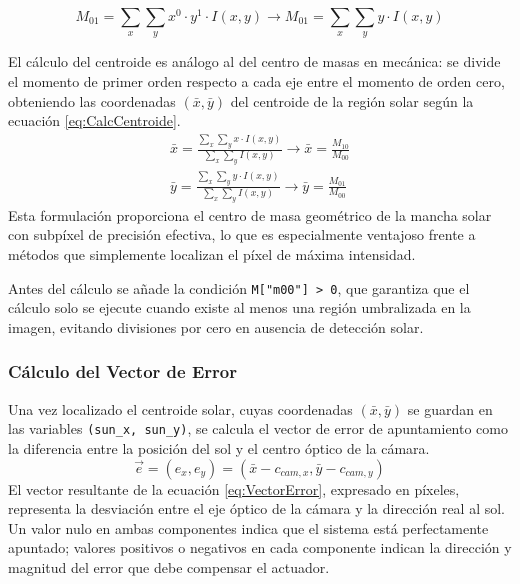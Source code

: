 \begin{enumerate}
	\begin{equation}
		M_{01}=\sum_x \sum_y x^0\cdot y^1\cdot I(x,y)\to M_{01}=\sum_x \sum_y y\cdot I(x,y)
	\label{eq:momentos01}
	\end{equation}
	
El cálculo del centroide es análogo al del centro de masas en mecánica: se divide el momento de primer orden respecto a cada eje entre el momento de orden cero, obteniendo las coordenadas $(\bar{x},\bar{y})$ del centroide de la región solar según la ecuación \eqref{eq:CalcCentroide}.
	\begin{equation}
    			\begin{aligned}
        			\bar{x}=\frac{\sum_x \sum_y x\cdot I(x,y)}{\sum_x \sum_y I(x,y)}\to \bar{x}=\frac{M_{10}}{M_{00}}\\
        			\bar{y}=\frac{\sum_x \sum_y y\cdot I(x,y)}{\sum_x \sum_y I(x,y)}\to \bar{y}=\frac{M_{01}}{M_{00}}
    			\end{aligned}
  		\label{eq:CalcCentroide}
		\end{equation}
Esta formulación proporciona el centro de masa geométrico de la mancha solar con subpíxel de precisión efectiva, lo que es especialmente ventajoso frente a métodos que simplemente localizan el píxel de máxima intensidad.

Antes del cálculo se añade la condición \texttt{M["m00"] > 0}, que garantiza que el cálculo solo se ejecute cuando existe al menos una región umbralizada en la imagen, evitando divisiones por cero en ausencia de detección solar.
\end{enumerate}


\subsubsection{Cálculo del Vector de Error}

Una vez localizado el centroide solar, cuyas coordenadas $(\bar{x},\bar{y})$ se guardan en las variables \texttt{(sun\_x, sun\_y)}, se calcula el vector de error de apuntamiento como la diferencia entre la posición del sol y el centro óptico de la cámara.
	\begin{equation}
		\vec{e}=(e_x,e_y)=(\bar{x}-c_{cam,x},\bar{y}-c_{cam,y})
	\label{eq:VectorError}
	\end{equation}
El vector resultante de la ecuación \eqref{eq:VectorError}, expresado en píxeles, representa la desviación entre el eje óptico de la cámara y la dirección real al sol. Un valor nulo en ambas componentes indica que el sistema está perfectamente apuntado; valores positivos o negativos en cada componente indican la dirección y magnitud del error que debe compensar el actuador.


